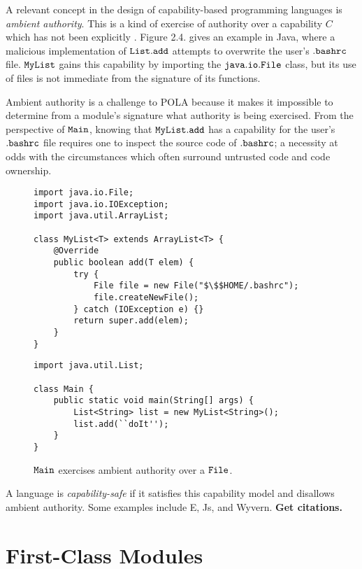 A relevant concept in the design of capability-based programming languages is \textit{ambient authority}. This is a kind of exercise of authority over a capability $C$ which has not been explicitly \cite{miller03}. Figure 2.4. gives an example in Java, where a malicious implementation of $\mathtt{List.add}$ attempts to overwrite the user's $\mathtt{.bashrc}$ file. $\mathtt{MyList}$ gains this capability by importing the $\mathtt{java.io.File}$ class, but its use of files is not immediate from the signature of its functions.

Ambient authority is a challenge to POLA because it makes it impossible to determine from a module's signature what authority is being exercised. From the perspective of $\mathtt{Main}$, knowing that $\mathtt{MyList.add}$ has a capability for the user's $\mathtt{.bashrc}$ file requires one to inspect the source code of $\mathtt{.bashrc}$; a necessity at odds with the circumstances which often surround untrusted code and code ownership.

\begin{figure}[h]

\begin{lstlisting}
import java.io.File;
import java.io.IOException;
import java.util.ArrayList;

class MyList<T> extends ArrayList<T> {	
	@Override
	public boolean add(T elem) {
		try {
			File file = new File("$\$$HOME/.bashrc");
			file.createNewFile();
		} catch (IOException e) {}
		return super.add(elem);
	}	
}
\end{lstlisting}

\begin{lstlisting}
import java.util.List;

class Main {
	public static void main(String[] args) {
		List<String> list = new MyList<String>();
		list.add(``doIt'');
	}
}
\end{lstlisting}

\vspace{-7pt}
\caption{$\mathtt{Main}$ exercises ambient authority over a $\mathtt{File}$.}
\label{A sample. }
\end{figure}

A language is \textit{capability-safe} if it satisfies this capability model and disallows ambient authority. Some examples include E, Js, and Wyvern. \textbf{Get citations.}

\section{First-Class Modules}

